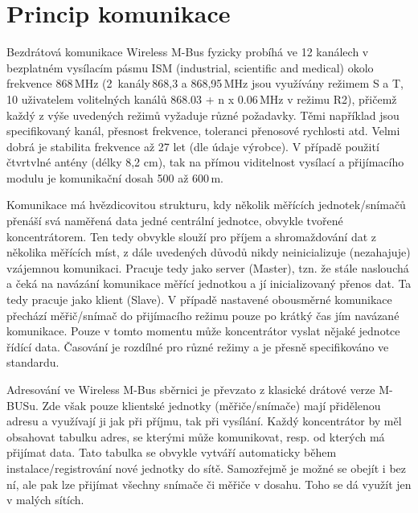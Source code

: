 
\section{Princip komunikace}

Bezdrátová komunikace Wireless M-Bus fyzicky probíhá ve 12 kanálech v bezplatném vysílacím pásmu ISM (industrial, scientific and medical) okolo frekvence 868\,MHz (2~kanály\,868,3 a 868,95\,MHz jsou využívány režimem S a T, 10 uživatelem volitelných kanálů 868.03 + n x 0.06\,MHz v režimu R2), přičemž každý z výše uvedených režimů vyžaduje různé požadavky. Těmi například jsou specifikovaný kanál, přesnost frekvence, toleranci přenosové rychlosti atd. Velmi dobrá je stabilita frekvence až 27 let (dle údaje výrobce). V případě použití čtvrtvlné antény (délky 8,2 cm), tak na přímou viditelnost vysílací a přijímacího modulu je komunikační dosah 500 až 600\,m.

Komunikace má hvězdicovitou strukturu, kdy několik měřících jednotek/snímačů přenáší svá naměřená data jedné centrální jednotce, obvykle tvořené koncentrátorem. Ten tedy obvykle slouží pro příjem a shromaždování dat z několika měřících míst, z dále uvedených důvodů nikdy neinicializuje (nezahajuje) vzájemnou komunikaci. Pracuje tedy jako server (Master), tzn. že stále naslouchá a čeká na navázání komunikace měřící jednotkou a jí inicializovaný přenos dat. Ta tedy pracuje jako klient (Slave). V případě nastavené obousměrné komunikace přechází měřič/snímač do přijímacího režimu pouze po krátký čas jím navázané komunikace. Pouze v tomto momentu může koncentrátor vyslat nějaké jednotce řídící data. Časování je rozdílné pro různé režimy a je přesně specifikováno ve standardu.

Adresování ve Wireless M-Bus sběrnici je převzato z klasické drátové verze M-BUSu. Zde však pouze klientské jednotky (měřiče/snímače) mají přidělenou adresu a využívají ji jak při příjmu, tak při vysílání. Každý koncentrátor by měl obsahovat tabulku adres, se kterými může komunikovat, resp. od kterých má přijímat data. Tato tabulka se obvykle vytváří automaticky během instalace/registrování nové jednotky do sítě. Samozřejmě je možné se obejít i bez ní, ale pak lze přijímat všechny snímače či měřiče v dosahu. Toho se dá využít jen v malých sítích. 


